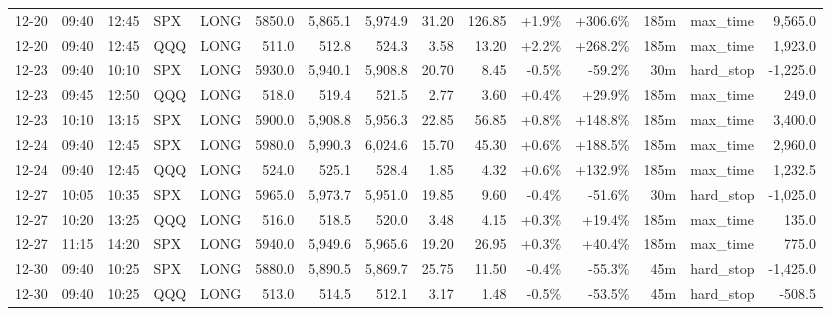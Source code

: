\documentclass[11pt,a4paper,twoside]{article}
\begin{document}
\begin{landscape}
\begin{center}
\begin{longtable}{>{\color{txtmain}}l l l l l r r r r r r r r >{\color{txtmain}}l r}
12-20 & 09:40 & 12:45 & SPX & LONG & 5850.0 & 5,865.1 & 5,974.9 & 31.20 & 126.85 & \textcolor{wingreen}{+1.9\%} & \textcolor{wingreen}{+306.6\%} & 185m & max\_time & \textcolor{wingreen}{9,565.0} \\
12-20 & 09:40 & 12:45 & QQQ & LONG & 511.0 & 512.8 & 524.3 & 3.58 & 13.20 & \textcolor{wingreen}{+2.2\%} & \textcolor{wingreen}{+268.2\%} & 185m & max\_time & \textcolor{wingreen}{1,923.0} \\
12-23 & 09:40 & 10:10 & SPX & LONG & 5930.0 & 5,940.1 & 5,908.8 & 20.70 & 8.45 & \textcolor{lossred}{-0.5\%} & \textcolor{lossred}{-59.2\%} & 30m & hard\_stop & \textcolor{lossred}{-1,225.0} \\
12-23 & 09:45 & 12:50 & QQQ & LONG & 518.0 & 519.4 & 521.5 & 2.77 & 3.60 & \textcolor{wingreen}{+0.4\%} & \textcolor{wingreen}{+29.9\%} & 185m & max\_time & \textcolor{wingreen}{249.0} \\
12-23 & 10:10 & 13:15 & SPX & LONG & 5900.0 & 5,908.8 & 5,956.3 & 22.85 & 56.85 & \textcolor{wingreen}{+0.8\%} & \textcolor{wingreen}{+148.8\%} & 185m & max\_time & \textcolor{wingreen}{3,400.0} \\
12-24 & 09:40 & 12:45 & SPX & LONG & 5980.0 & 5,990.3 & 6,024.6 & 15.70 & 45.30 & \textcolor{wingreen}{+0.6\%} & \textcolor{wingreen}{+188.5\%} & 185m & max\_time & \textcolor{wingreen}{2,960.0} \\
12-24 & 09:40 & 12:45 & QQQ & LONG & 524.0 & 525.1 & 528.4 & 1.85 & 4.32 & \textcolor{wingreen}{+0.6\%} & \textcolor{wingreen}{+132.9\%} & 185m & max\_time & \textcolor{wingreen}{1,232.5} \\
12-27 & 10:05 & 10:35 & SPX & LONG & 5965.0 & 5,973.7 & 5,951.0 & 19.85 & 9.60 & \textcolor{lossred}{-0.4\%} & \textcolor{lossred}{-51.6\%} & 30m & hard\_stop & \textcolor{lossred}{-1,025.0} \\
12-27 & 10:20 & 13:25 & QQQ & LONG & 516.0 & 518.5 & 520.0 & 3.48 & 4.15 & \textcolor{wingreen}{+0.3\%} & \textcolor{wingreen}{+19.4\%} & 185m & max\_time & \textcolor{wingreen}{135.0} \\
12-27 & 11:15 & 14:20 & SPX & LONG & 5940.0 & 5,949.6 & 5,965.6 & 19.20 & 26.95 & \textcolor{wingreen}{+0.3\%} & \textcolor{wingreen}{+40.4\%} & 185m & max\_time & \textcolor{wingreen}{775.0} \\
12-30 & 09:40 & 10:25 & SPX & LONG & 5880.0 & 5,890.5 & 5,869.7 & 25.75 & 11.50 & \textcolor{lossred}{-0.4\%} & \textcolor{lossred}{-55.3\%} & 45m & hard\_stop & \textcolor{lossred}{-1,425.0} \\
12-30 & 09:40 & 10:25 & QQQ & LONG & 513.0 & 514.5 & 512.1 & 3.17 & 1.48 & \textcolor{lossred}{-0.5\%} & \textcolor{lossred}{-53.5\%} & 45m & hard\_stop & \textcolor{lossred}{-508.5} \\

\end{longtable}
\end{center}
\end{landscape}
\end{document}
